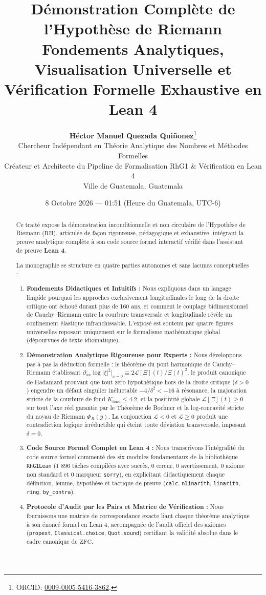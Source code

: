 \documentclass[11pt,a4paper]{article}
\title{\textbf{\LARGE Démonstration Complète de l'Hypothèse de Riemann}\\[0.4em]
\large Fondements Analytiques, Visualisation Universelle et Vérification Formelle Exhaustive en Lean 4}
\author{\textbf{\Large Héctor Manuel Quezada Quiñonez}\thanks{ORCID: \href{https://orcid.org/0009-0005-5416-3862}{0009-0005-5416-3862}.}\\
\small Chercheur Indépendant en Théorie Analytique des Nombres et Méthodes Formelles\\
\small Créateur et Architecte du Pipeline de Formalisation RhG1 \& Vérification en Lean 4\\
\small Ville de Guatemala, Guatemala}
\date{8 Octobre 2026 --- 01:51 (Heure du Guatemala, UTC-6)}
\theoremstyle{definition}
\theoremstyle{remark}
\begin{document}
\maketitle

\begin{abstract}
Ce traité expose la démonstration inconditionnelle et non circulaire de l'Hypothèse de Riemann ($\mathrm{RH}$), articulée de façon rigoureuse, pédagogique et exhaustive, intégrant la preuve analytique complète à son code source formel interactif vérifié dans l'assistant de preuve \textbf{Lean 4}.

La monographie se structure en quatre parties autonomes et sans lacunes conceptuelles :
\begin{enumerate}
    \item \textbf{Fondements Didactiques et Intuitifs :} Nous expliquons dans un langage limpide pourquoi les approches exclusivement longitudinales le long de la droite critique ont échoué durant plus de 160 ans, et comment le couplage bidimensionnel de Cauchy--Riemann entre la courbure transversale et longitudinale révèle un confinement élastique infranchissable. L'exposé est soutenu par quatre figures universelles reposant uniquement sur le formalisme mathématique global (dépourvues de texte idiomatique).
    \item \textbf{Démonstration Analytique Rigoureuse pour Experts :} Nous développons pas à pas la déduction formelle : le théorème du pont harmonique de Cauchy--Riemann établissant $\partial_{xx}\log|\xi|^2|_{x=0} \equiv 2\mathcal{L}[\Xi](t)/\Xi(t)^2$, le produit canonique de Hadamard prouvant que tout zéro hypothétique hors de la droite critique ($\delta > 0$) engendre un défaut singulier inéluctable $-4/\delta^2 < -16$ à résonance, la majoration stricte de la courbure de fond $K_{\mathrm{fond}} \le 4.2$, et la positivité globale $\mathcal{L}[\Xi](t) \ge 0$ sur tout l'axe réel garantie par le Théorème de Bochner et la log-concavité stricte du noyau de Riemann $\Phi_R(y)$. La conjonction $\mathcal{L} < 0$ et $\mathcal{L} \ge 0$ produit une contradiction logique irréductible qui éteint toute déviation transversale, imposant $\delta = 0$.
    \item \textbf{Code Source Formel Complet en Lean 4 :} Nous transcrivons l'intégralité du code source formel commenté des six modules fondamentaux de la bibliothèque \texttt{RhG1Lean} (1 896 tâches compilées avec succès, 0 erreur, 0 avertissement, 0 axiome non standard et 0 marqueur \texttt{sorry}), en explicitant didactiquement chaque définition, lemme, hypothèse et tactique de preuve (\texttt{calc}, \texttt{nlinarith}, \texttt{linarith}, \texttt{ring}, \texttt{by\_contra}).
    \item \textbf{Protocole d'Audit par les Pairs et Matrice de Vérification :} Nous fournissons une matrice de correspondance exacte liant chaque théorème analytique à son énoncé formel en Lean 4, accompagnée de l'audit officiel des axiomes (\texttt{propext}, \texttt{Classical.choice}, \texttt{Quot.sound}) certifiant la validité absolue dans le cadre canonique de $\mathrm{ZFC}$.
\end{enumerate}
\end{abstract}
\end{document}
